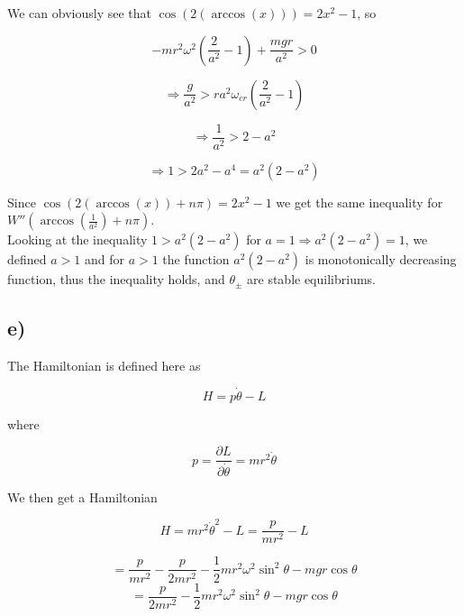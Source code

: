 \documentclass[a4paper,norsk, 10pt]{article}
\begin{document}
We can obviously see that $\cos(2(\arccos(x))) = 2x^2 - 1$, so

$$
-mr^2\omega^2\left(\frac{2}{a^2}-1\right) + \frac{mgr}{a^2} > 0
$$

$$
\Rightarrow \frac{g}{a^2} > ra^2\omega_{cr}\left(\frac{2}{a^2}-1\right)
$$

$$
\Rightarrow \frac{1}{a^2} > 2-a^2
$$

$$
\Rightarrow 1> 2a^2 - a^4 = a^2(2-a^2)
$$

Since $\cos(2(\arccos(x)) + n\pi) = 2x^2 - 1$ we get the same inequality for $W''(\arccos(\frac{1}{a^2})+n\pi)$.\\

Looking at the inequality $1 > a^2(2-a^2)$ for $a = 1 \Rightarrow a^2(2-a^2) = 1$, we defined $a>1$ and for $a>1$ the function $a^2(2-a^2)$ is monotonically decreasing function, thus the inequality holds, and $\theta_{\pm}$ are stable equilibriums.


\subsection*{e)}
The Hamiltonian is defined here as

\begin{equation}
H = p\dot{\theta} - L
\label{eq:hamiltonian}
\end{equation}

where

$$
p = \frac{\partial L}{\partial \dot{\theta}} = mr^2\dot{\theta}
$$

We then get a Hamiltonian

$$
H = mr^2\dot{\theta}^2 - L = \frac{p}{mr^2}- L 
$$

$$
= \frac{p}{mr^2} - \frac{p}{2mr^2} - \frac{1}{2}mr^2\omega^2\sin^2\theta - mgr\cos\theta
$$
$$
= \frac{p}{2mr^2} - \frac{1}{2}mr^2\omega^2\sin^2\theta - mgr\cos\theta
$$
\end{document}
